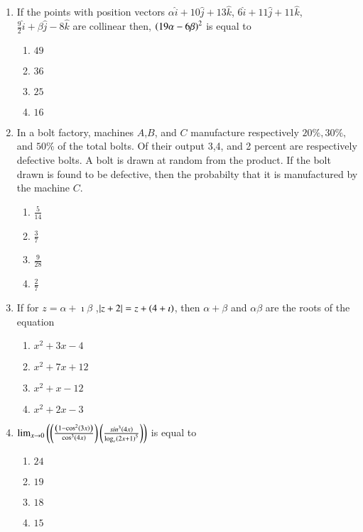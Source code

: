 \documentclass[journal]{IEEEtran}
\begin{document}
\begin{enumerate}
{\begin{multicols}{4}
\end{multicols}
}
\item{
If the points with position vectors $\alpha\hat{i}+10\hat{j}+13\hat{k}$, $6\hat{i}+11\hat{j}+11\hat{k}$, $\frac{9}{2}\hat{i}+\beta\hat{j}-8\hat{k}$ are collinear then, $\left(19\alpha-6\beta\right)^2$ is equal to
\begin{multicols}{4}
\begin{enumerate}
\item $49$
\item $36$
\item $25$
\item $16$
\end{enumerate}
\end{multicols}
}
\item{
In a bolt factory, machines $A$,$B$, and $C$ manufacture respectively $20\%, 30\%,$ and $50\%$ of the total bolts. Of their output 3,4, and 2 percent are respectively defective bolts. A bolt is drawn at random from the product. If the bolt drawn is found to be defective, then the probabilty that it is manufactured by the machine $C$.
\begin{multicols}{4}
\begin{enumerate}
\item $\frac{5}{14}$
\item $\frac{3}{7}$
\item $\frac{9}{28}$
\item $\frac{2}{7}$
\end{enumerate}
\end{multicols}
}
\item{
If for $z=\alpha+\imath\beta$  ,$\left\vert z+2\right\vert=z+\left(4+\imath\right)$, then $\alpha+\beta$ and $\alpha\beta$ are the roots of the equation
\begin{multicols}{4}
\begin{enumerate}
\item $x^2+3x-4$
\item $x^2+7x+12$
\item $x^2+x-12$
\item $x^2+2x-3$
\end{enumerate}
\end{multicols}
}
\item{
$\lim_{x \to 0}\left(\left(\frac{\left(1-\cos^2\left(3x\right)\right)}{\cos^3\left(4x\right)}\right)\left(\frac{sin^3\left(4x\right)}{\log_e\left(2x+1\right)^5}\right)\right)$ is equal to
\begin{multicols}{4}
\begin{enumerate}
\item $24$
\item $19$
\item $18$
\item $15$
\end{enumerate}
\end{multicols}
}
\end{enumerate}
\end{document}
